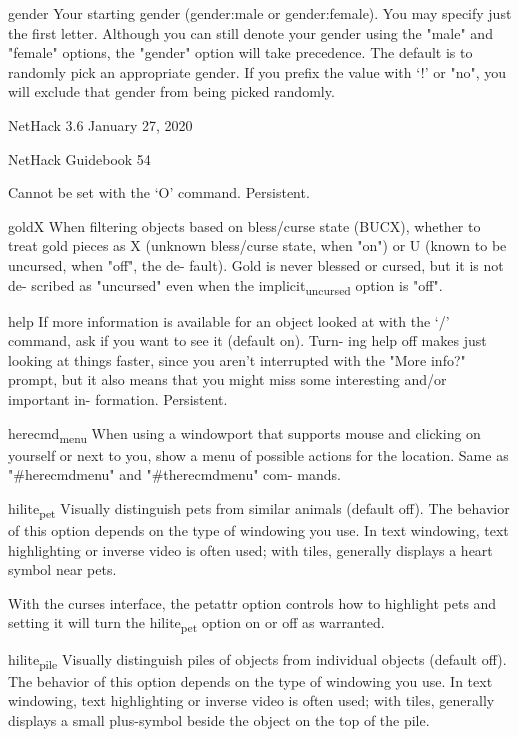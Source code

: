 \documentclass[11pt]{article}
\begin{document}
gender
 Your starting gender (gender:male or gender:female).  You may
 specify just the first letter. Although you can still denote
 your gender using the "male" and "female" options, the "gender"
 option will take precedence. The default is to randomly pick
 an appropriate gender. If you prefix the value with `!' or
 "no", you will exclude that gender from being picked randomly.


NetHack 3.6                   January 27, 2020





NetHack Guidebook                       54



Cannot be set with the `O' command. Persistent.

goldX
 When filtering objects based on bless/curse state (BUCX),
 whether to treat gold pieces as X (unknown bless/curse state,
 when "on") or U (known to be uncursed, when "off", the de-
 fault).  Gold is never blessed or cursed, but it is not de-
 scribed as "uncursed" even when the implicit\textsubscript{uncursed} option is
 "off".

help
 If more information is available for an object looked at with
 the `/' command, ask if you want to see it (default on). Turn-
 ing help off makes just looking at things faster, since you
 aren't interrupted with the "More info?" prompt, but it also
 means that you might miss some interesting and/or important in-
 formation. Persistent.

herecmd\textsubscript{menu}
 When using a windowport that supports mouse and clicking on
 yourself or next to you, show a menu of possible actions for
 the location. Same as "\#herecmdmenu" and "\#therecmdmenu" com-
 mands.

hilite\textsubscript{pet}
 Visually distinguish pets from similar animals (default off).
 The behavior of this option depends on the type of windowing
 you use. In text windowing, text highlighting or inverse video
 is often used; with tiles, generally displays a heart symbol
 near pets.

With the curses interface, the petattr option controls how to
highlight pets and setting it will turn the hilite\textsubscript{pet} option
on or off as warranted.

hilite\textsubscript{pile}
 Visually distinguish piles of objects from individual objects
 (default off). The behavior of this option depends on the type
 of windowing you use. In text windowing, text highlighting or
 inverse video is often used; with tiles, generally displays a
 small plus-symbol beside the object on the top of the pile.
\end{document}
